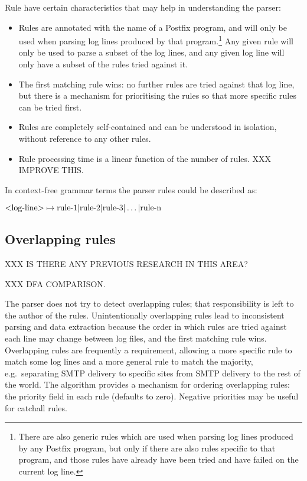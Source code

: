 \label{rule characteristics}

Rule have certain characteristics that may help in understanding the
parser:

\begin{itemize}

    \item Rules are annotated with the name of a Postfix program, and will
        only be used when parsing log lines produced by that
        program.\footnote{There are also generic rules which are used when
        parsing log lines produced by any Postfix program, but only if
        there are also rules specific to that program, and those rules have
        already have been tried and have failed on the current log line.}
        Any given rule will only be used to parse a subset of the log
        lines, and any given log line will only have a subset of the rules
        tried against it.

    \item The first matching rule wins: no further rules are tried against
        that log line, but there is a mechanism for prioritising the rules
        so that more specific rules can be tried first.

    \item Rules are completely self-contained and can be understood in
        isolation, without reference to any other rules.

    \item Rule processing time is a linear function of the number of rules.
        XXX IMPROVE THIS\@.

\end{itemize}

\label{comparison against context-free grammars}

In context-free grammar terms the parser rules could be described as:

$\text{\textless{}log-line\textgreater{}} \mapsto \text{rule-1} |
\text{rule-2} | \text{rule-3} | \dots | \text{rule-n}$


\subsection{Overlapping rules}

\label{overlapping rules}

XXX IS THERE ANY PREVIOUS RESEARCH IN THIS AREA\@?

XXX DFA COMPARISON\@.

The parser does not try to detect overlapping rules; that responsibility is
left to the author of the rules.  Unintentionally overlapping rules lead to
inconsistent parsing and data extraction because the order in which rules
are tried against each line may change between log files, and the first
matching rule wins.  Overlapping rules are frequently a requirement,
allowing a more specific rule to match some log lines and a more general
rule to match the majority, e.g.\ separating \gls{SMTP} delivery to
specific sites from \gls{SMTP} delivery to the rest of the world.  The
algorithm provides a mechanism for ordering overlapping rules: the priority
field in each rule (defaults to zero).  Negative priorities may be useful
for catchall rules.

